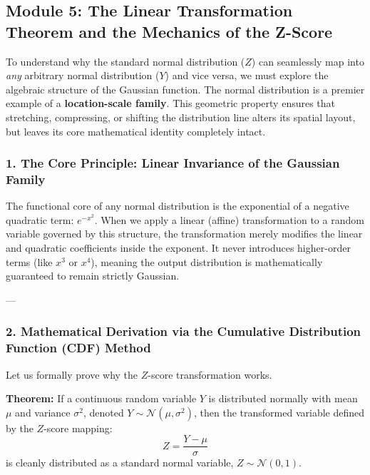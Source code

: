 \documentclass{article}
\begin{document}
\subsection*{Module 5: The Linear Transformation Theorem and the Mechanics of the Z-Score}

To understand why the standard normal distribution ($Z$) can seamlessly map into \textit{any} arbitrary normal distribution ($Y$) and vice versa, we must explore the algebraic structure of the Gaussian function. The normal distribution is a premier example of a \textbf{location-scale family}. This geometric property ensures that stretching, compressing, or shifting the distribution line alters its spatial layout, but leaves its core mathematical identity completely intact.

\subsubsection*{1. The Core Principle: Linear Invariance of the Gaussian Family}
The functional core of any normal distribution is the exponential of a negative quadratic term: $e^{-x^2}$. When we apply a linear (affine) transformation to a random variable governed by this structure, the transformation merely modifies the linear and quadratic coefficients inside the exponent. It never introduces higher-order terms (like $x^3$ or $x^4$), meaning the output distribution is mathematically guaranteed to remain strictly Gaussian.

---

\subsubsection*{2. Mathematical Derivation via the Cumulative Distribution Function (CDF) Method}
Let us formally prove why the $Z$-score transformation works. 

\noindent \textbf{Theorem:} If a continuous random variable $Y$ is distributed normally with mean $\mu$ and variance $\sigma^2$, denoted $Y \sim \mathcal{N}(\mu, \sigma^2)$, then the transformed variable defined by the $Z$-score mapping:
\begin{equation}
    Z = \frac{Y - \mu}{\sigma}
\end{equation}
is cleanly distributed as a standard normal variable, $Z \sim \mathcal{N}(0, 1)$.
\end{document}
